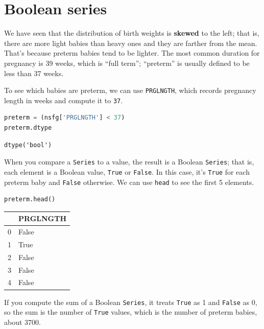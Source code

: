 \hypertarget{boolean-series}{%
\section{Boolean series}\label{boolean-series}}

We have seen that the distribution of birth weights is \textbf{skewed}
to the left; that is, there are more light babies than heavy ones and
they are farther from the mean. That's because preterm babies tend to be
lighter. The most common duration for pregnancy is 39 weeks, which is
``full term''; ``preterm'' is usually defined to be less than 37 weeks.

To see which babies are preterm, we can use
\passthrough{\lstinline!PRGLNGTH!}, which records pregnancy length in
weeks and compute it to \passthrough{\lstinline!37!}.

\begin{lstlisting}[language=Python,style=source]
preterm = (nsfg['PRGLNGTH'] < 37)
preterm.dtype
\end{lstlisting}

\begin{lstlisting}[style=output]
dtype('bool')
\end{lstlisting}

When you compare a \passthrough{\lstinline!Series!} to a value, the
result is a Boolean \passthrough{\lstinline!Series!}; that is, each
element is a Boolean value, \passthrough{\lstinline!True!} or
\passthrough{\lstinline!False!}. In this case, it's
\passthrough{\lstinline!True!} for each preterm baby and
\passthrough{\lstinline!False!} otherwise. We can use
\passthrough{\lstinline!head!} to see the first 5 elements.

\begin{lstlisting}[language=Python,style=source]
preterm.head()
\end{lstlisting}

\begin{tabular}{ll}
\toprule
{} &  PRGLNGTH \\
\midrule
0 &     False \\
1 &      True \\
2 &     False \\
3 &     False \\
4 &     False \\
\bottomrule
\end{tabular}

If you compute the sum of a Boolean \passthrough{\lstinline!Series!}, it
treats \passthrough{\lstinline!True!} as 1 and
\passthrough{\lstinline!False!} as 0, so the sum is the number of
\passthrough{\lstinline!True!} values, which is the number of preterm
babies, about 3700.

